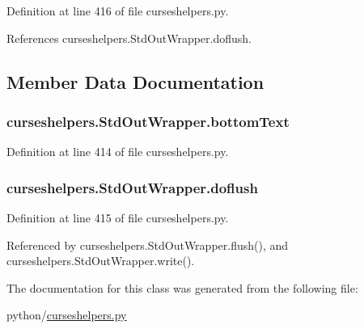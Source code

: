 Definition at line 416 of file curseshelpers.\-py.



References curseshelpers.\-Std\-Out\-Wrapper.\-doflush.



\subsection{Member Data Documentation}
\subsubsection[{bottom\-Text}]{\setlength{\rightskip}{0pt plus 5cm}curseshelpers.\-Std\-Out\-Wrapper.\-bottom\-Text}\label{classcurseshelpers_1_1StdOutWrapper_a107fbcad070676b8f2132726f2b7ee28}


Definition at line 414 of file curseshelpers.\-py.

\subsubsection[{doflush}]{\setlength{\rightskip}{0pt plus 5cm}curseshelpers.\-Std\-Out\-Wrapper.\-doflush}\label{classcurseshelpers_1_1StdOutWrapper_a8d111b0ad072db53b8283a98ec809972}


Definition at line 415 of file curseshelpers.\-py.



Referenced by curseshelpers.\-Std\-Out\-Wrapper.\-flush(), and curseshelpers.\-Std\-Out\-Wrapper.\-write().



The documentation for this class was generated from the following file\-:\begin{DoxyCompactItemize}
\item 
python/\hyperlink{curseshelpers_8py}{curseshelpers.\-py}\end{DoxyCompactItemize}
